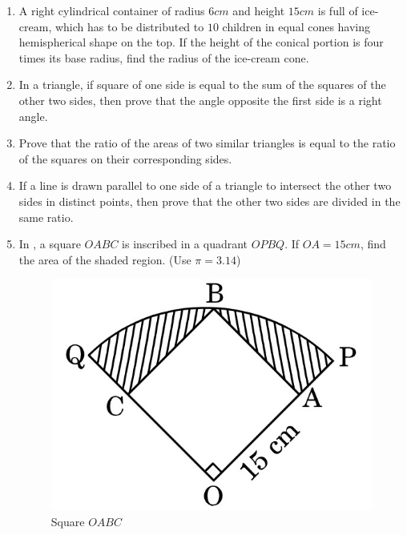 \begin{enumerate}
\item A right cylindrical container of radius $6 cm$ and height $15 cm$ is full of ice-cream, which has to be distributed to $10$ children in equal cones having hemispherical shape on the top. If the height of the conical portion is four times its base radius, find the radius of the ice-cream cone.

\item In a triangle, if square of one side is equal to the sum of the squares of the other two sides, then prove that the angle opposite the first side is a right angle.

\item Prove that the ratio of the areas of two similar triangles is equal to the ratio of the squares on their corresponding sides.

\item If a line is drawn parallel to one side of a triangle to intersect the  other two sides in distinct points, then prove that the other two sides are divided in the same ratio.



\item In  , a square $OABC$ is inscribed in a quadrant $OPBQ$. If $OA = 15 cm$, find the area of the shaded region. (Use $\pi = 3.14$)
\begin{figure}[H]
    \centering
    \includegraphics[width=\columnwidth]{figs/img4.jpg}
    \caption{Square $OABC$}
    \label{fig:Fig_4}
\end{figure}


\end{enumerate}
